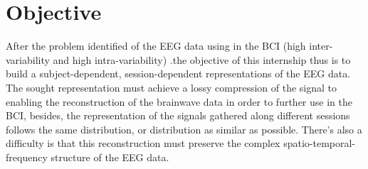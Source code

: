 \section{Objective}
After the problem identified of the EEG data using in the BCI (high inter-variability and high intra-variability) .the objective of this internship thus is to build a subject-dependent, session-dependent representations of the EEG data. The sought representation must achieve a lossy compression of the signal to enabling the reconstruction of the brainwave data in order to further use in the BCI, besides, the representation of the signals gathered along different sessions follows the same distribution, or distribution as similar as possible. There's also a difficulty is that this reconstruction must preserve the complex spatio-temporal-frequency structure of the EEG data.




